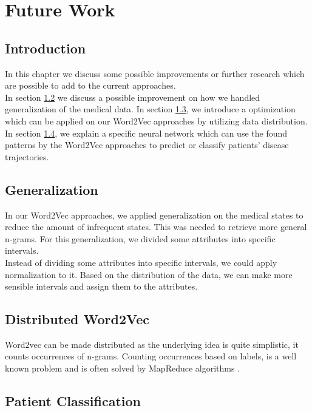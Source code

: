 \graphicspath{ {FutureWork/Images/} }


\chapter{Future Work}
\label{cha:futureWork}

\section{Introduction}
In this chapter we discuss some possible improvements or further research which are possible to add to the current approaches. \\
In section \ref{sec:generalization} we discuss a possible improvement on how we handled generalization of the medical data. In section \ref{sec:distributed}, we introduce a optimization which can be applied on our Word2Vec approaches by utilizing data distribution. In section \ref{sec:PatientClassification}, we explain a specific neural network which can use the found patterns by the Word2Vec approaches to predict or classify patients' disease trajectories.


\section{Generalization}
\label{sec:generalization}

In our Word2Vec approaches, we applied generalization on the medical states to reduce the amount of infrequent states. This was needed to retrieve more general n-grams. For this generalization, we divided some attributes into specific intervals. \\

Instead of dividing some attributes into specific intervals, we could apply normalization to it. Based on the distribution of the data, we can make more sensible intervals and assign them to the attributes.


\section{Distributed Word2Vec}
\label{sec:distributed}

Word2vec can be made distributed as the underlying idea is quite simplistic, it counts occurrences of n-grams. Counting occurrences based on labels, is a well known problem and is often solved by MapReduce algorithms \cite{mapreduce:article}. 


\section{Patient Classification}
\label{sec:PatientClassification}


